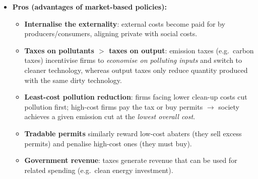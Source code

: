 \begin{itemize}
\begin{itemize}
\begin{center}
\end{center}
  \end{itemize}
  \begin{itemize}
    \item \textbf{Pros (advantages of market-based policies):}
    \begin{itemize}
      \item \textbf{Internalise the externality}: external costs become paid for by producers/consumers, aligning private with social costs.
      \item \textbf{Taxes on pollutants $>$ taxes on output}: emission taxes (e.g.\ carbon taxes) incentivise firms to \textit{economise on polluting inputs} and switch to cleaner technology, whereas output taxes only reduce quantity produced with the same dirty technology.
      \item \textbf{Least-cost pollution reduction}: firms facing lower clean-up costs cut pollution first; high-cost firms pay the tax or buy permits $\to$ society achieves a given emission cut at the \textit{lowest overall cost}.
      \item \textbf{Tradable permits} similarly reward low-cost abaters (they sell excess permits) and penalise high-cost ones (they must buy).
      \item \textbf{Government revenue}: taxes generate revenue that can be used for related spending (e.g.\ clean energy investment).
    \end{itemize}

\end{itemize}
\end{itemize}
